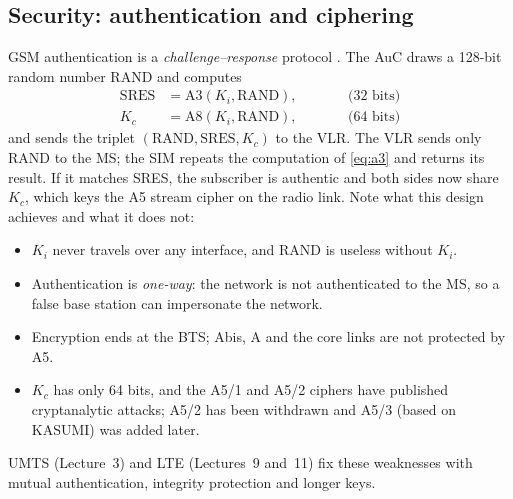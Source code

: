 \documentclass[11pt,a4paper]{article}
\begin{document}
\subsection{Security: authentication and ciphering}
GSM authentication is a \emph{challenge--response} protocol \cite{ts43020}. The AuC
draws a 128-bit random number RAND and computes
\begin{subequations}\label{eq:a3a8}
\begin{align}
  \text{SRES} &= \mathrm{A3}(K_i,\text{RAND}), \qquad &&\text{(32 bits)} \label{eq:a3}\\
  K_c &= \mathrm{A8}(K_i,\text{RAND}), \qquad &&\text{(64 bits)} \label{eq:a8}
\end{align}
\end{subequations}
and sends the triplet $(\text{RAND},\text{SRES},K_c)$ to the VLR. The VLR sends only
RAND to the MS; the SIM repeats the computation of \cref{eq:a3} and returns its
result. If it matches SRES, the subscriber is authentic and both sides now share
$K_c$, which keys the A5 stream cipher on the radio link. Note what this design
achieves and what it does not:
\begin{itemize}
  \item $K_i$ never travels over any interface, and RAND is useless without $K_i$.
  \item Authentication is \emph{one-way}: the network is not authenticated to the MS,
        so a false base station can impersonate the network.
  \item Encryption ends at the BTS; Abis, A and the core links are not protected by A5.
  \item $K_c$ has only 64 bits, and the A5/1 and A5/2 ciphers have published
        cryptanalytic attacks; A5/2 has been withdrawn and A5/3 (based on KASUMI)
        was added later.
\end{itemize}
UMTS (Lecture~3) and LTE (Lectures~9 and~11) fix these weaknesses with mutual
authentication, integrity protection and longer keys.
\end{document}
